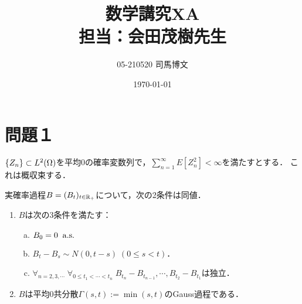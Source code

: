\documentclass[uplatex,dvipdfmx]{jsarticle}
\title{数学講究XA\\担当：会田茂樹先生}
\author{05-210520 司馬博文}
\date{\today}
\begin{document}
\maketitle

\section*{問題１}

\begin{lemma*}
    $\{Z_n\}\subset L^2(\Omega)$を平均$0$の確率変数列で，$\sum_{n=1}^\infty E[Z_n^2]<\infty$を満たすとする．
    これは概収束する．
\end{lemma*}

\begin{lemma*}
    実確率過程$B=(B_t)_{t\in\mathbb{R}_+}$について，次の2条件は同値．
    \begin{enumerate}
        \item $B$は次の3条件を満たす：
        \begin{enumerate}[(a)]
            \item $B_0=0\;\;\mathrm{a.s.}$
            \item $B_t-B_s\sim N(0,t-s)\;(0\le s<t)$．
            \item $\forall_{n=2,3,\cdots}\;\forall_{0\le t_1<\cdots<t_n}\;B_{t_n}-B_{t_{n-1}},\cdots,B_{t_2}-B_{t_1}$は独立．
        \end{enumerate}
        \item $B$は平均$0$共分散$\Gamma(s,t):=\min(s,t)$のGauss過程である．
    \end{enumerate}
\end{lemma*}
\end{document}
